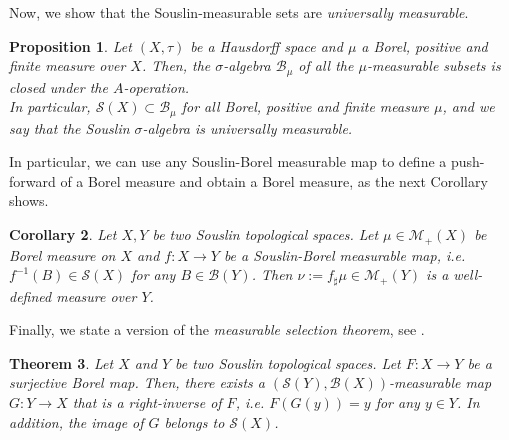 \documentclass[10pt,leqno]{amsart}
\numberwithin{equation}{section}
\newtheorem{teorema}{Theorem}[section]
\newtheorem{prop}[teorema]{Proposition}
\newtheorem{co}[teorema]{Corollary}
\begin{document}
Now, we show that the Souslin-measurable sets are \textit{universally measurable}.

\begin{prop}\label{univ meas of souslin}
    Let $(X,\tau)$ be a Hausdorff space and $\mu$ a Borel, positive and finite measure over $X$. Then, the $\sigma$-algebra $\mathcal{B}_\mu$ of all the $\mu$-measurable subsets is closed under the $A$-operation.
    \\
    In particular, $\mathcal{S}(X)\subset \mathcal{B}_\mu$ for all Borel, positive and finite measure $\mu$, and we say that the Souslin $\sigma$-algebra is universally measurable.
\end{prop}


In particular, we can use any Souslin-Borel measurable map to define a push-forward of a Borel measure and obtain a Borel measure, as the next Corollary shows.

\begin{co}\label{push-forward by a souslin-borel map}
    Let $X,Y$ be two Souslin topological spaces. Let $\mu\in \mathcal{M}_+(X)$ be  Borel measure on $X$ and $f:X\to Y$ be a Souslin-Borel measurable map, i.e. $f^{-1}(B) \in \mathcal{S}(X)$ for any $B\in \mathcal{B}(Y)$. Then $\nu:= f_\sharp \mu \in \mathcal{M}_+(Y)$ is a well-defined measure over $Y$. 
\end{co}






Finally, we state a version of the \textit{measurable selection theorem}, see \cite[Theorem 6.9.1]{Bogachev07}.

\begin{teorema}\label{measurable selection}
    Let $X$ and $Y$ be two Souslin topological spaces. Let $F:X\to Y$ be a surjective Borel map. Then, there exists a $(\mathcal{S}(Y),\mathcal{B}(X))$-measurable map $G:Y \to X$ that is a right-inverse of $F$, i.e. $F(G(y))=y$ for any $y\in Y$. In addition, the image of $G$ belongs to $\mathcal{S}(X)$.
\end{teorema}
\end{document}
